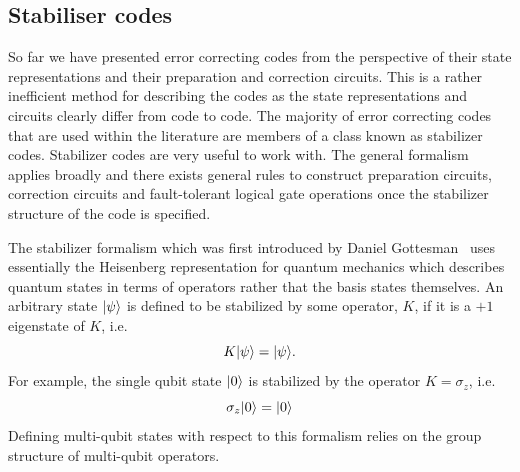 

%
%

\subsection{Stabiliser codes}\label{sec:stab_code}

So far we have presented error correcting codes from the perspective of their state representations and their preparation and correction circuits.  
This is a rather inefficient method for describing the codes as the state representations and circuits clearly differ from code to code.  The majority 
of error correcting codes that are used within the literature are members of a class known as stabilizer codes.  Stabilizer codes are 
very useful to work with.  The general formalism applies broadly and there exists general rules to construct preparation circuits, correction circuits 
and fault-tolerant logical gate operations once the stabilizer structure of the code is specified.  

The stabilizer formalism which was first introduced by Daniel Gottesman~\cite{G97+} uses essentially the Heisenberg 
representation for quantum mechanics which describes quantum states in terms of operators rather that the 
basis states themselves.  An arbitrary state $|\psi\rangle$ is defined to be stabilized by some operator, $K$, if it is a 
$+1$ eigenstate of $K$, i.e.
\begin{equation}
K\ket{\psi} = \ket{\psi}.
\end{equation}
For example, the single qubit state $|0\rangle$ is stabilized by the operator $K = \sigma_z$, i.e.
\begin{equation}
\sigma_z\ket{0} = \ket{0}
\end{equation}
Defining multi-qubit states with respect to this formalism relies on the group structure of multi-qubit operators.  

